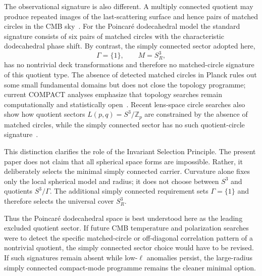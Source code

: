 \documentclass[aps,prd,onecolumn,superscriptaddress,longbibliography,nofootinbib,notitlepage]{revtex4-2}
\begin{document}
The observational signature is also different. A multiply connected quotient may
produce repeated images of the last-scattering surface and hence pairs of matched
circles in the CMB sky~\cite{Cornish1998,PlanckTopology2016}. For the Poincar\'e
dodecahedral model the standard signature consists of six pairs of matched
circles with the characteristic dodecahedral phase shift. By contrast, the simply
connected sector adopted here,
\begin{equation}
  \Gamma=\{1\},
  \qquad
  M=S^3_R,
\end{equation}
has no nontrivial deck transformations and therefore no matched-circle signature
of this quotient type. The absence of detected matched circles in Planck rules out
some small fundamental domains but does not close the topology programme; current
COMPACT analyses emphasize that topology searches remain computationally and
statistically open~\cite{COMPACTPromise2024,COMPACTPartIIA2024}. Recent lens-space
circle searches also show how quotient sectors $L(p,q)=S^3/\mathbb Z_p$ are
constrained by the absence of matched circles, while the simply connected sector
has no such quotient-circle signature~\cite{COMPACTLens2025}.

This distinction clarifies the role of the Invariant Selection Principle. The
present paper does not claim that all spherical space forms are impossible.
Rather, it deliberately selects the minimal simply connected carrier. Curvature
alone fixes only the local spherical model and radius; it does not choose between
$S^3$ and quotients $S^3/\Gamma$. The additional simply connected requirement
sets $\Gamma=\{1\}$ and therefore selects the universal cover $S^3_R$.

Thus the Poincar\'e dodecahedral space is best understood here as the leading
excluded quotient sector. If future CMB temperature and polarization searches were
to detect the specific matched-circle or off-diagonal correlation pattern of a
nontrivial quotient, the simply connected sector choice would have to be revised.
If such signatures remain absent while low-$\ell$ anomalies persist, the
large-radius simply connected compact-mode programme remains the cleaner minimal
option.
\end{document}
